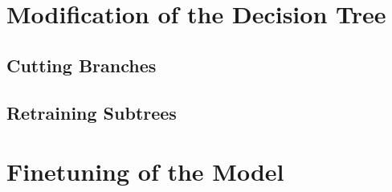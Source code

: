 
\section{Modification of the Decision Tree}




\subsection*{Cutting Branches}



\subsection*{Retraining Subtrees}



\section{Finetuning of the Model}




